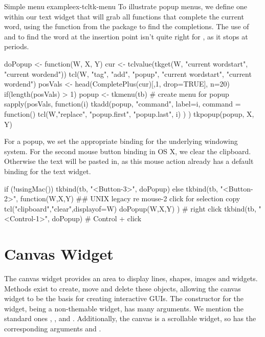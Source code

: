 \begin{example}{Simple menu example}{ex-tcltk-menu}
To illustrate popup menus, we define one within our text widget that will grab all
functions that complete the current word, using the
 function from the  package to find
the completions.  The use of  and
 to find the word at the insertion point isn't quite
right for \R, as it stops at periods.
\begin{Schunk}
\begin{Sinput}
 doPopup <- function(W, X, Y) {
   cur <- tclvalue(tkget(W, "current  wordstart", 
                            "current wordend"))
   tcl(W, "tag", "add", "popup", "current  wordstart", 
                                 "current wordend")
   posVals <- head(CompletePlus(cur)[,1, drop=TRUE], n=20)
   if(length(posVals) > 1) {
     popup <- tkmenu(tb)                # create menu for popup
     sapply(posVals, function(i) {         
       tkadd(popup, "command", label=i, command = function() {
         tcl(W,"replace", "popup.first", "popup.last", i)
       })
     })
     tkpopup(popup, X, Y)
  }}
\end{Sinput}
\end{Schunk}

For a popup, we set the appropriate binding for the underlying
windowing system. For the second mouse button binding in OS X, we
clear the clipboard. Otherwise the text  will be pasted in, as this mouse
action already has a default binding for the text widget.

\begin{Schunk}
\begin{Sinput}
 if (!usingMac()) {
   tkbind(tb, "<Button-3>", doPopup)
 } else {
   tkbind(tb, "<Button-2>", function(W,X,Y) {
     ## UNIX legacy re mouse-2 click for selection copy
     tcl("clipboard","clear",displayof=W) 
     doPopup(W,X,Y)
     })      # right click
   tkbind(tb, "<Control-1>", doPopup)     # Control + click
 }
\end{Sinput}
\end{Schunk}
\end{example}

\section{Canvas Widget}
\label{sec:tcltk:canvas-widget}

 
The canvas widget provides an area to display lines, shapes, images and widgets. Methods exist to create, move and delete these objects, allowing the canvas widget to be the basis for creating interactive GUIs. The constructor  for the widget, being a non-themable widget, has many arguments. We mention the standard ones , , and . Additionally, the canvas is a scrollable widget, so has the corresponding arguments  and .


